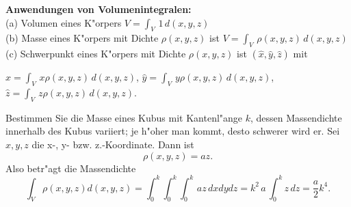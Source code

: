 \begin{bspX}
{\bf Anwendungen von Volumenintegralen:}\\
(a) Volumen eines K"orpers $V = \int_V\, 1\, d(x,y,z)$\\
(b) Masse eines K"orpers mit Dichte $\rho(x,y,z)$ ist   $V = \int_V\, \rho(x,y,z)\, d(x,y,z)$\\
(c) Schwerpunkt eines K"orpers mit Dichte $\rho(x,y,z)$ ist   $(\hat x,\hat y,\hat z)$ mit \\ 
\centerline{
$\hat x = \int_V\, x\rho(x,y,z)\, d(x,y,z)$, $\hat y = \int_V\, y\rho(x,y,z)\, d(x,y,z)$, $\hat z = \int_V\, z\rho(x,y,z)\, d(x,y,z)$.}     
\end{bspX}
\begin{bspX} Bestimmen Sie die Masse eines Kubus mit Kantenl"ange $k$, 
dessen Massendichte innerhalb des Kubus variiert;
je h"oher man kommt, desto schwerer wird er. Sei $x, y, z$ die x-, y- bzw. z.-Koordinate. Dann ist
$$ \rho(x,y,z)= a z.$$
Also betr"agt die Massendichte
$$ \int_V \rho(x,y,z)d(x,y,z) = \int_0^k\int_0^k\int_0^k \,az\, dx dy dz = k^2\,a\,\int_0^k z\, dz = \frac a 2 k^4.$$ 
 \end{bspX}
 \begin{auf}\chb\label{block8A1}

\end{auf}
